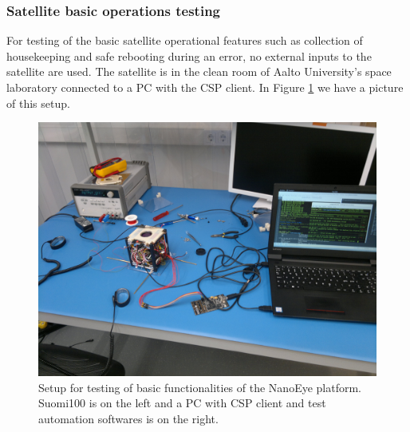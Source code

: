 \documentclass[english,12pt,a4paper,pdftex,elec,utf8]{aaltothesis}
\begin{document}
\subsubsection{Satellite basic operations testing}
For testing of the basic satellite operational features such as collection of housekeeping and safe rebooting during an error, no external inputs to the satellite are used. The satellite is in the clean room of Aalto University's space laboratory connected to a PC with the CSP client. 
In Figure \ref{basictest} we have a picture of this setup.
\begin{figure}[h!]
\centering
\includegraphics[scale=0.3]{basicsetup}
\caption{Setup for testing of basic functionalities of the NanoEye platform. Suomi100 is on the left and a PC with CSP client and test automation softwares is on the right.}
\label{basictest}
\end{figure}  
\end{document}

